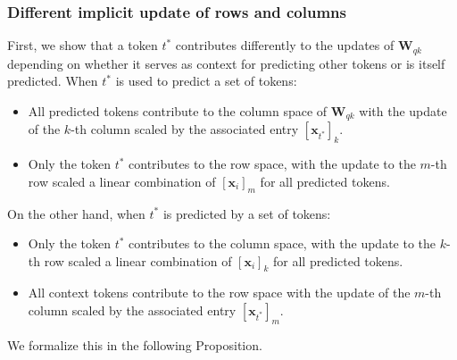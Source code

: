 %
%
\subsubsection{Different implicit update of rows and columns}
\label{supp-math-prop-gradient-column-rows}
%
First, we show that a token $t^*$ contributes differently to the updates of $\bm{W}_{qk}$ depending on whether it serves as context for predicting other tokens or is itself predicted.
%
When $t^*$ is used to predict a set of tokens:
%
\begin{itemize}[noitemsep,nolistsep]
%
    \item All predicted tokens contribute to the column space of $\bm{W}_{qk}$ with the update of the $k$-th column scaled by the associated entry $[\bm{x}_{t^*}]_k$.
    \item Only the token $t^*$ contributes to the row space, with the update to the $m$-th row scaled a linear combination of  $[\bm{x}_i]_m$ for all predicted tokens.
%
\end{itemize}
%
On the other hand, when $t^*$ is predicted by a set of tokens:
%
\begin{itemize}[noitemsep,nolistsep]
%
    \item Only the token $t^*$ contributes to the column space, with the update to the $k$-th row scaled a linear combination of  $[\bm{x}_i]_k$ for all predicted tokens.
    \item All context tokens contribute to the row space with the update of the $m$-th column scaled by the associated entry $[\bm{x}_{t^*}]_m$.
%
\end{itemize}
%
We formalize this in the following Proposition.
%


%

%






